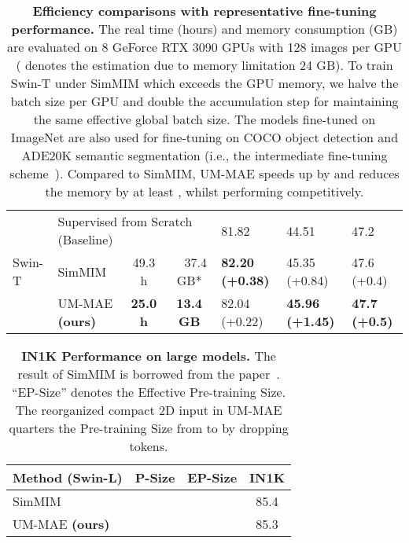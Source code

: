 \documentclass{article}
\begin{document}
\begin{table}
{\begin{tabular}{l|l||c|c||l|l|l}
        \multirow{3}{*}{Swin-T~\cite{liu2021swin}} & \multicolumn{3}{l||}{Supervised from Scratch (Baseline)}  & 81.82 & 44.51 & 47.2 \\ \cline{2-7}
        & SimMIM~\cite{xie2021simmim} & 49.3 h  & \ \ 37.4 GB* & \textbf{82.20 {\scriptsize (+0.38)}}  & 45.35 {\scriptsize (+0.84)} & 47.6 {\scriptsize (+0.4)}\\
        & UM-MAE \textbf{(ours)} & \textbf{25.0 h}  & \textbf{13.4 GB} & 82.04 {\scriptsize (+0.22)} & \textbf{45.96 {\scriptsize (+1.45)}} & \textbf{47.7 {\scriptsize (+0.5)}} \\ \hline
        \end{tabular}
    }
	\vspace{2pt}
    \caption{\textbf{Efficiency comparisons with representative fine-tuning performance.} The real time (hours) and memory consumption (GB) are evaluated on 8 GeForce RTX 3090 GPUs with 128 images per GPU ( denotes the estimation due to memory limitation 24 GB). To train Swin-T under SimMIM which exceeds the GPU memory, we halve the batch size per GPU and double the accumulation step for maintaining the same effective global batch size. The models fine-tuned on ImageNet are also used for fine-tuning on COCO object detection and ADE20K semantic segmentation (i.e., the intermediate fine-tuning scheme~\cite{bao2021beit,liu2021swinv2}). Compared to SimMIM, UM-MAE speeds up by  and reduces the memory by at least , whilst performing competitively.
    }
    \label{table_efficiency}
	\vspace{-20pt}
\end{table}



\begin{wraptable}{r}{0.42\textwidth}
\begin{minipage}[ht]{0.4\textwidth}
\vspace{-10pt}
    \renewcommand\arraystretch{1.2}
    \setlength{\tabcolsep}{6.pt}
    \footnotesize
    \centering
    \resizebox{\textwidth}{!}
    {
        \begin{tabular}{l|c|c|c}
        \hline
Method (Swin-L) & P-Size & EP-Size & IN1K \\\hline
        SimMIM~\cite{xie2021simmim}&  &  & 85.4 \\
        UM-MAE \textbf{(ours)}     &  &  & 85.3 \\
        \hline
        \end{tabular}
    }
	\vspace{-6pt}
	\caption{\textbf{IN1K Performance on large models.} The result of SimMIM is borrowed from the paper~\cite{xie2021simmim}. ``EP-Size'' denotes the Effective Pre-training Size. The reorganized compact 2D input in UM-MAE quarters the Pre-training Size from  to  by dropping  tokens.
	}
\label{table_large_model}
\vspace{-20pt}
\end{minipage} \vspace{12pt}
\end{wraptable}
\end{document}
